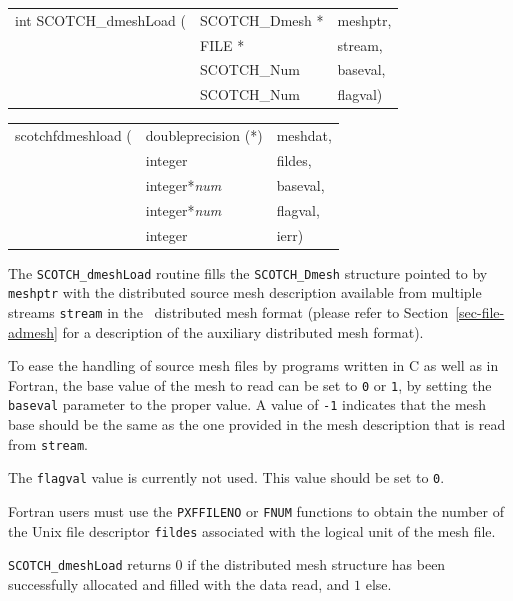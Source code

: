 \begin{itemize}
\progsyn

{\tt\begin{tabular}{l@{}ll}
int SCOTCH\_dmeshLoad ( & SCOTCH\_Dmesh * & meshptr, \\
                        & FILE *          & stream, \\
                        & SCOTCH\_Num     & baseval, \\
                        & SCOTCH\_Num     & flagval)
\end{tabular}}

{\tt\begin{tabular}{l@{}ll}
scotchfdmeshload ( & doubleprecision (*) & meshdat, \\
                   & integer             & fildes, \\
                   & integer*{\it num}   & baseval, \\
                   & integer*{\it num}   & flagval, \\
                   & integer             & ierr)
\end{tabular}}

\progdes

The {\tt SCOTCH\_dmeshLoad} routine fills the
\texttt{SCOTCH\_\lbt Dmesh} structure pointed to by \texttt{meshptr}
with the distributed source mesh description available from
multiple streams \texttt{stream} in the \scotch\ distributed mesh
format (please refer to Section~\ref{sec-file-admesh} for a description
of the auxiliary distributed mesh format).

To ease the handling of source mesh files by programs written in C as
well as in Fortran, the base value of the mesh to read can be set
to \texttt{0} or \texttt{1}, by setting the \texttt{baseval} parameter
to the proper value. A value of \texttt{-1} indicates that the mesh
base should be the same as the one provided in the mesh description
that is read from \texttt{stream}.

The \texttt{flagval} value is currently not used. This value should be
set to \texttt{0}.

Fortran users must use the \texttt{PXFFILENO} or \texttt{FNUM}
functions to obtain the number of the Unix file descriptor
\texttt{fildes} associated with the logical unit of the mesh
file.

\progret

\texttt{SCOTCH\_dmeshLoad} returns $0$ if the distributed mesh
structure has been successfully allocated and filled with the data
read, and $1$ else.
\end{itemize}


